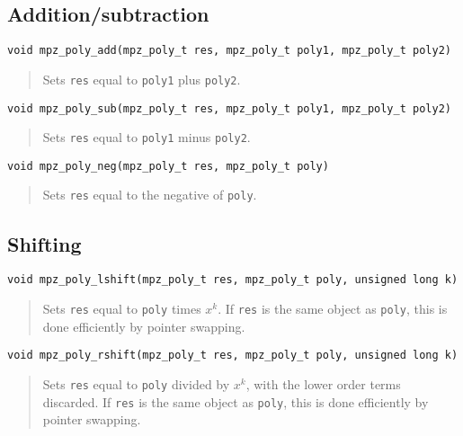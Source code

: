 \documentclass[a4paper,10pt]{article}
\newcommand{\code}{\lstinline}
\begin{document}
\subsection{Addition/subtraction}


\begin{lstlisting}
void mpz_poly_add(mpz_poly_t res, mpz_poly_t poly1, mpz_poly_t poly2)
\end{lstlisting}
\begin{quote}
Sets \code{res} equal to \code{poly1} plus \code{poly2}.
\end{quote}

\begin{lstlisting}
void mpz_poly_sub(mpz_poly_t res, mpz_poly_t poly1, mpz_poly_t poly2)
\end{lstlisting}
\begin{quote}
Sets \code{res} equal to \code{poly1} minus \code{poly2}.
\end{quote}

\begin{lstlisting}
void mpz_poly_neg(mpz_poly_t res, mpz_poly_t poly)
\end{lstlisting}
\begin{quote}
Sets \code{res} equal to the negative of \code{poly}.
\end{quote}


\subsection{Shifting}

\begin{lstlisting}
void mpz_poly_lshift(mpz_poly_t res, mpz_poly_t poly, unsigned long k)
\end{lstlisting}
\begin{quote}
Sets \code{res} equal to \code{poly} times $x^k$. If \code{res} is the same object as \code{poly}, this is done efficiently by pointer swapping.
\end{quote}

\begin{lstlisting}
void mpz_poly_rshift(mpz_poly_t res, mpz_poly_t poly, unsigned long k)
\end{lstlisting}
\begin{quote}
Sets \code{res} equal to \code{poly} divided by $x^k$, with the lower order terms discarded. If \code{res} is the same object as \code{poly}, this is done efficiently by pointer swapping.
\end{quote}
\end{document}
